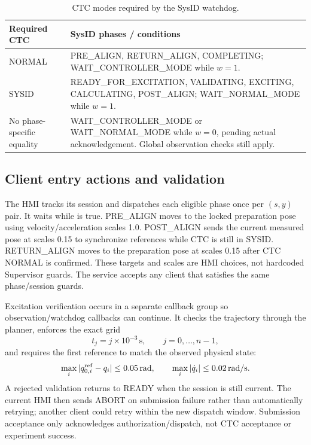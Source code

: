\documentclass[11pt,a4paper]{report}
\newcommand{\id}[1]{\texttt{\small\detokenize{#1}}}
\begin{document}
\begin{table}[htbp]
\centering
\caption{CTC modes required by the SysID watchdog.}\label{tab:modeexpect}
\begin{tabularx}{\linewidth}{L{.18\linewidth}X}
\toprule Required CTC & SysID phases / conditions \\\midrule
NORMAL & PRE\_ALIGN, RETURN\_ALIGN, COMPLETING; WAIT\_CONTROLLER\_MODE while $w=1$. \\
SYSID & READY\_FOR\_EXCITATION, VALIDATING, EXCITING, CALCULATING, POST\_ALIGN; WAIT\_NORMAL\_MODE while $w=1$. \\
No phase-specific equality & WAIT\_CONTROLLER\_MODE or WAIT\_NORMAL\_MODE while $w=0$, pending actual acknowledgement. Global observation checks still apply. \\
\bottomrule
\end{tabularx}
\end{table}

\subsection{Client entry actions and validation}
The HMI tracks its session and dispatches each eligible phase once per $(s,y)$ pair. It waits while \id{waiting_for_settle} is true. PRE\_ALIGN moves to the locked preparation pose using velocity/acceleration scales 1.0. POST\_ALIGN sends the current measured pose at scales 0.15 to synchronize references while CTC is still in SYSID. RETURN\_ALIGN moves to the preparation pose at scales 0.15 after CTC NORMAL is confirmed. These targets and scales are HMI choices, not hardcoded Supervisor guards. The service accepts any client that satisfies the same phase/session guards.

Excitation verification occurs in a separate callback group so observation/watchdog callbacks can continue. It checks the trajectory through the planner, enforces the exact grid
\begin{equation}
 t_j=j\times 10^{-3}\,\mathrm{s},\qquad j=0,\ldots,n-1,
\end{equation}
and requires the first reference to match the observed physical state:
\begin{equation}
 \max_i|q_{0,i}^{\rm ref}-q_i|\le0.05\,\mathrm{rad},\qquad
 \max_i|\dot q_i|\le0.02\,\mathrm{rad/s}.
\end{equation}
A rejected validation returns to READY when the session is still current. The current HMI then sends ABORT on submission failure rather than automatically retrying; another client could retry within the new dispatch window. Submission acceptance only acknowledges authorization/dispatch, not CTC acceptance or experiment success.
\end{document}
